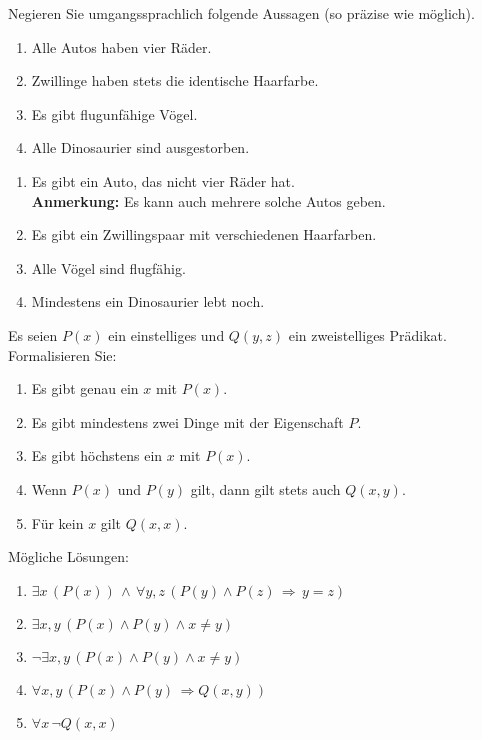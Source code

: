 \begin{example}
    Negieren Sie umgangssprachlich folgende Aussagen (so präzise wie möglich).
    \begin{enumerate}
        \item Alle Autos haben vier Räder.
        \item Zwillinge haben stets die identische Haarfarbe.
        \item Es gibt flugunfähige Vögel.
        \item Alle Dinosaurier sind ausgestorben.
    \end{enumerate}
    \tcblower
    \begin{enumerate}
        \item Es gibt ein Auto, das nicht vier Räder hat.
        \\ \textbf{Anmerkung:} Es kann auch mehrere solche Autos geben.
        \item Es gibt ein Zwillingspaar mit verschiedenen Haarfarben.
        \item Alle Vögel sind flugfähig.
        \item Mindestens ein Dinosaurier lebt noch.
    \end{enumerate}
\end{example}

\begin{example}
    Es seien $P(x)$ ein einstelliges und $Q(y,z)$ ein zweistelliges Prädikat. Formalisieren Sie:
    \begin{enumerate}
        \item Es gibt genau ein $x$ mit $P(x)$.
        \item Es gibt mindestens zwei Dinge mit der Eigenschaft $P$.
        \item Es gibt höchstens ein $x$ mit $P(x)$.
        \item Wenn $P(x)$ und $P(y)$ gilt, dann gilt stets auch $Q(x,y)$.
        \item Für kein $x$ gilt $Q(x,x)$.
    \end{enumerate}
    \tcblower
    Mögliche Lösungen:
    \begin{enumerate}
        \item $\exists x\,(P(x))\,\land\, \forall y,z\, (P(y)\land P(z)\,\Rightarrow\, y=z)$
        \item $\exists x,y\,(P(x)\land P(y)\land x\neq y)$
        \item $\neg \exists x,y\,(P(x)\land P(y)\land x\neq y)$
        \item $\forall x,y\,(P(x)\land P(y)\,\Rightarrow Q(x,y))$
        \item $\forall x\,\neg Q(x,x)$
    \end{enumerate}
\end{example}


